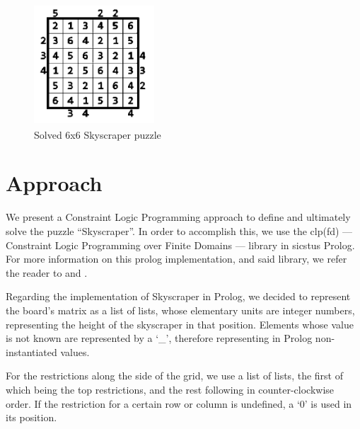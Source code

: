 \documentclass{llncs}
\begin{document}
\begin{figure}[h!]
\begin{center}
\includegraphics[height=4.5cm,width=4.5cm]{images/skyscraper_solved.png}
\caption{Solved 6x6 Skyscraper puzzle}
\label{Figure 2}
\end{center}
\end{figure}

%
\section{Approach}
We present a Constraint Logic Programming approach to define and ultimately solve the puzzle ``Skyscraper''. In order to accomplish this, we use the clp(fd) --- Constraint Logic Programming over Finite Domains --- library in sicstus Prolog. For more information on this prolog implementation, and said library, we refer the reader to \cite{sterling_shapiro_warren_2010} and \cite{carlsson_fruhwirth_2016}.

Regarding the implementation of Skyscraper in Prolog, we decided to represent the board's matrix as a list of lists, whose elementary units are integer numbers, representing the height of the skyscraper in that position.
Elements whose value is not known are represented by  a `\_', therefore representing in Prolog non-instantiated values.

For the restrictions along the side of the grid, we use a list of lists, the first of which being the top restrictions, and the rest following in counter-clockwise order. If the restriction for a certain row or column is undefined, a `0' is used in its position.
\end{document}
